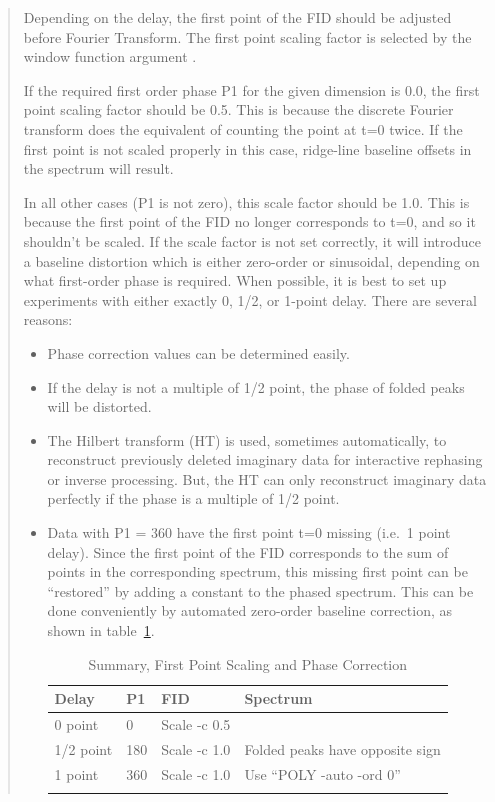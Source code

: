 \begin{quotation}
Depending on the delay, the first point of the FID should be adjusted before Fourier Transform.  The first point scaling factor is selected by the window function argument .

If the required first order phase P1 for the given dimension is 0.0, the first point scaling factor should be 0.5.  This is because the discrete Fourier transform does the equivalent of counting the point at t=0 twice.  If the first point is not scaled properly in this case, ridge-line baseline offsets in the spectrum will result.

In all other cases (P1 is not zero), this scale factor should be 1.0. This is because the first point of the FID no longer corresponds to t=0, and so it shouldn't be scaled. If the scale factor is not set correctly, it will introduce a baseline distortion which is either zero-order or sinusoidal, depending on what first-order phase is required. When possible, it is best to set up experiments with either exactly 0, 1/2, or 1-point delay.  There are several reasons:
\begin{itemize}
  \item Phase correction values can be determined easily.
  \item If the delay is not a multiple of 1/2 point, the phase of folded peaks will be distorted.
  \item The Hilbert transform (HT) is used, sometimes automatically, to reconstruct previously deleted imaginary data for interactive rephasing or inverse processing. But, the HT can only reconstruct imaginary data perfectly if the phase is a multiple of 1/2 point.
  \item Data with P1 = 360 have the first point t=0 missing (i.e.\ 1 point delay). Since the first point of the FID corresponds to the sum of points in the corresponding spectrum, this missing first point can be ``restored'' by adding a constant to the phased spectrum.  This can be done conveniently by automated zero-order baseline correction, as shown in table~\ref{table: NMRPipe -c}.
  
    \begin{table}
    \begin{center}
    \caption{Summary, First Point Scaling and Phase Correction}
    \begin{tabular}{llll}
    \toprule
    Delay & P1 & FID & Spectrum\\
    \midrule
    0   point &   0 & Scale -c 0.5 \\
    1/2 point & 180 & Scale -c 1.0 & Folded peaks have opposite sign \\
    1   point & 360 & Scale -c 1.0 & Use ``POLY -auto -ord 0'' \\
    \bottomrule
    \label{table: NMRPipe -c}
    \end{tabular}
    \end{center}
    \end{table}
  
\end{itemize}
\end{quotation}


